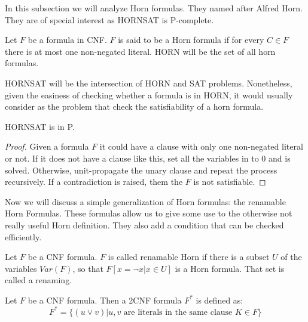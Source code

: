 In this subsection we will analyze Horn formulas. They named after Alfred Horn\cite{horn1951sentences}. They are of special interest as HORNSAT is P-complete.


\begin{definition}
  Let $F$ be a formula in CNF. $F$ is said to be a Horn formula if for every $C \in F$ there is at most one non-negated literal. HORN will be the set of all horn formulas.

  HORNSAT will be the intersection of HORN and SAT problems. Nonetheless, given the easiness of checking whether a formula is in HORN, it would usually consider as the problem that check the satisfiability of a horn formula.
\end{definition}


\begin{proposition}
  HORNSAT is in P.
\end{proposition}
\begin{proof}
  Given a formula $F$ it could have a clause with only one non-negated literal or not. If it does not have a clause like this, set all the variables in to 0 and is solved. Otherwise, unit-propagate the unary clause and repeat the process recursively. If a contradiction is raised, them the $F$ is not satisfiable.
\end{proof}


Now we will discuss a simple generalization of Horn formulas: the renamable Horn Formulas. These formulas allow us to give some use to the otherwise not really useful Horn definition. They also add a condition that can be checked efficiently.

\begin{definition}
  Let $F$ be a CNF formula. $F$ is called renamable Horn if there is a subset $U$ of the variables $Var(F)$, so that $F[x=\neg x | x \in U]$ is a Horn formula.
  That set is called a renaming.
\end{definition}


\begin{definition}
  Let $F$ be a CNF formula. Then a 2CNF formula $F^*$ is defined as:
  $$F^* = \{(u \vee v) | u,v \text{ are literals in the same clause } K \in F \}$$
\end{definition}


